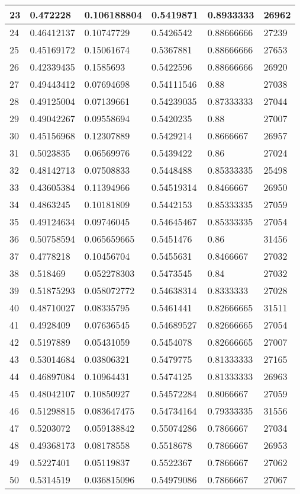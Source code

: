 \begin{longtable}{|l|l|l|l|l|l|}
23 & 0.472228 & 0.106188804 & 0.5419871 & 0.8933333 & 26962 \\ \hline 
24 & 0.46412137 & 0.10747729 & 0.5426542 & 0.88666666 & 27239 \\ \hline 
25 & 0.45169172 & 0.15061674 & 0.5367881 & 0.88666666 & 27653 \\ \hline 
26 & 0.42339435 & 0.1585693 & 0.5422596 & 0.88666666 & 26920 \\ \hline 
27 & 0.49443412 & 0.07694698 & 0.54111546 & 0.88 & 27038 \\ \hline 
28 & 0.49125004 & 0.07139661 & 0.54239035 & 0.87333333 & 27044 \\ \hline 
29 & 0.49042267 & 0.09558694 & 0.5420235 & 0.88 & 27007 \\ \hline 
30 & 0.45156968 & 0.12307889 & 0.5429214 & 0.8666667 & 26957 \\ \hline 
31 & 0.5023835 & 0.06569976 & 0.5439422 & 0.86 & 27024 \\ \hline 
32 & 0.48142713 & 0.07508833 & 0.5448488 & 0.85333335 & 25498 \\ \hline 
33 & 0.43605384 & 0.11394966 & 0.54519314 & 0.8466667 & 26950 \\ \hline 
34 & 0.4863245 & 0.10181809 & 0.5442153 & 0.85333335 & 27059 \\ \hline 
35 & 0.49124634 & 0.09746045 & 0.54645467 & 0.85333335 & 27054 \\ \hline 
36 & 0.50758594 & 0.065659665 & 0.5451476 & 0.86 & 31456 \\ \hline 
37 & 0.4778218 & 0.10456704 & 0.5455631 & 0.8466667 & 27032 \\ \hline 
38 & 0.518469 & 0.052278303 & 0.5473545 & 0.84 & 27032 \\ \hline 
39 & 0.51875293 & 0.058072772 & 0.54638314 & 0.8333333 & 27028 \\ \hline 
40 & 0.48710027 & 0.08335795 & 0.5461441 & 0.82666665 & 31511 \\ \hline 
41 & 0.4928409 & 0.07636545 & 0.54689527 & 0.82666665 & 27054 \\ \hline 
42 & 0.5197889 & 0.05431059 & 0.5454078 & 0.82666665 & 27007 \\ \hline 
43 & 0.53014684 & 0.03806321 & 0.5479775 & 0.81333333 & 27165 \\ \hline 
44 & 0.46897084 & 0.10964431 & 0.5474125 & 0.81333333 & 26963 \\ \hline 
45 & 0.48042107 & 0.10850927 & 0.54572284 & 0.8066667 & 27059 \\ \hline 
46 & 0.51298815 & 0.083647475 & 0.54734164 & 0.79333335 & 31556 \\ \hline 
47 & 0.5203072 & 0.059138842 & 0.55074286 & 0.7866667 & 27034 \\ \hline 
48 & 0.49368173 & 0.08178558 & 0.5518678 & 0.7866667 & 26953 \\ \hline 
49 & 0.5227401 & 0.05119837 & 0.5522367 & 0.7866667 & 27062 \\ \hline 
50 & 0.5314519 & 0.036815096 & 0.54979086 & 0.7866667 & 27067 \\ \hline 
\end{longtable}
